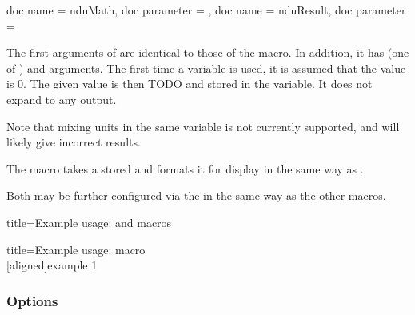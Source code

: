 \documentclass{article}
\begin{document}
\begin{docCommands}[]{
	{
		doc name = nduMath,
		doc parameter = 
	},
	{
		doc name = nduResult,
		doc parameter = 
	}
}

The first arguments of  are identical to those of the  macro. In addition, it has  (one of \textttt{+ - * /}) and  arguments. The first time a variable is used, it is assumed that the value is 0. The given value is then TODO and stored in the variable. It does not expand to any output.

Note that mixing units in the same variable is not currently supported, and will likely give incorrect results.

The  macro takes a stored  and formats it for display in the same way as .

Both may be further configured via the  in the same way as the other macros.

\begin{dispExample*}{
	title=Example usage:  and  macros
}
\end{dispExample*}

\begin{dispExample*}{
	title=Example usage:  macro
}
\\
[aligned]{example 1}
\end{dispExample*}
\end{docCommands}

\clearpage
\subsubsection{Options}
\end{document}
